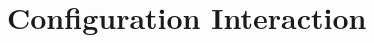 \documentclass[UTF8]{ctexart}
\begin{document}
	\subsection{}
	
	\subsection{}
	
	\subsection{}
	
	\subsection{}
	
	\subsection{}
	
	\subsection{}
	
	\subsection{}
	
	\subsection{}
	

\section{Configuration Interaction}
	
	\subsection{}
	
	\subsection{}
	
	\subsection{}
	
\end{document}
